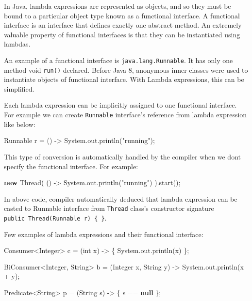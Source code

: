 \documentclass[12pt,a4paper,oneside,openright]{book}
\newenvironment{Shaded}{\begin{snugshade}}{\end{snugshade}}
\newcommand{\KeywordTok}[1]{\textcolor[rgb]{0.13,0.29,0.53}{\textbf{{#1}}}}
\newcommand{\DataTypeTok}[1]{\textcolor[rgb]{0.13,0.29,0.53}{{#1}}}
\newcommand{\StringTok}[1]{\textcolor[rgb]{0.31,0.60,0.02}{{#1}}}
\newcommand{\FunctionTok}[1]{\textcolor[rgb]{0.00,0.00,0.00}{{#1}}}
\newcommand{\NormalTok}[1]{{#1}}
\begin{document}
In Java, lambda expressions are represented as objects, and so they must
be bound to a particular object type known as a functional interface. A
functional interface is an interface that defines exactly one abstract
method. An extremely valuable property of functional interfaces is that
they can be instantiated using lambdas.

An example of a functional interface is \texttt{java.lang.Runnable}. It
has only one method void \texttt{run()} declared. Before Java 8,
anonymous inner classes were used to instantiate objects of functional
interface. With Lambda expressions, this can be simplified.

Each lambda expression can be implicitly assigned to one functional
interface. For example we can create \texttt{Runnable} interface's
reference from lambda expression like below:

\begin{Shaded}
\begin{Highlighting}[]
    \NormalTok{Runnable r = () -> System.}\FunctionTok{out}\NormalTok{.}\FunctionTok{println}\NormalTok{(}\StringTok{"running"}\NormalTok{);}
\end{Highlighting}
\end{Shaded}

This type of conversion is automatically handled by the compiler when we
dont specify the functional interface. For example:

\begin{Shaded}
\begin{Highlighting}[]
    \KeywordTok{new} \NormalTok{Thread(}
        \NormalTok{() -> System.}\FunctionTok{out}\NormalTok{.}\FunctionTok{println}\NormalTok{(}\StringTok{"running"}\NormalTok{)}
    \NormalTok{).}\FunctionTok{start}\NormalTok{();}
\end{Highlighting}
\end{Shaded}

In above code, compiler automatically deduced that lambda expression can
be casted to Runnable interface from \texttt{Thread} class's constructor
signature \texttt{public\ Thread(Runnable\ r)\ \{\ \}}.

Few examples of lambda expressions and their functional interface:

\begin{Shaded}
\begin{Highlighting}[]
    \NormalTok{Consumer<Integer>  c = (}\DataTypeTok{int} \NormalTok{x) -> \{ System.}\FunctionTok{out}\NormalTok{.}\FunctionTok{println}\NormalTok{(x) \};}

    \NormalTok{BiConsumer<Integer, String> b = (Integer x, String y)}
                                      \NormalTok{-> System.}\FunctionTok{out}\NormalTok{.}\FunctionTok{println}\NormalTok{(x + y);}

    \NormalTok{Predicate<String> p = (String s) -> \{ s == }\KeywordTok{null} \NormalTok{\};}
\end{Highlighting}
\end{Shaded}
\end{document}
